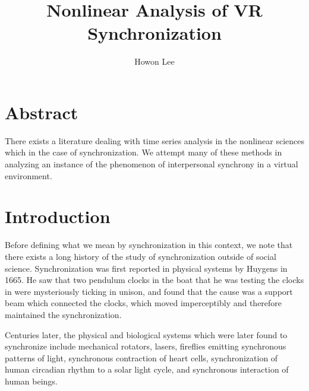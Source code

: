 \documentclass[12pt]{article}
\begin{document}
\title{Nonlinear Analysis of VR Synchronization}
\author{Howon Lee}
\maketitle

\section{Abstract}
There exists a literature dealing with time series analysis in the nonlinear sciences which in the case of synchronization. We attempt many of these methods in analyzing an instance of the phenomenon of interpersonal synchrony in a virtual environment.%



\section{Introduction}


Before defining what we mean by synchronization in this context, we note that there exists a long history of the study of synchronization outside of social science. Synchronization was first reported in physical systems by Huygens in 1665. He saw that two pendulum clocks in the boat that he was testing the clocks in were mysteriously ticking in unison, and found that the cause was a support beam which connected the clocks, which moved imperceptibly and therefore maintained the synchronization. %

Centuries later, the physical and biological systems which were later found to synchronize include mechanical rotators, lasers, fireflies emitting synchronous patterns of light, synchronous contraction of heart cells, synchronization of human circadian rhythm to a solar light cycle, and synchronous interaction of human beings. %
\end{document}
